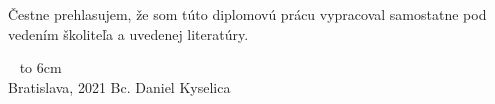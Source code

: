 {~}\vspace{12cm}

\thispagestyle{empty}
\noindent
\begin{minipage}{0.25\textwidth}~\end{minipage}
\begin{minipage}{0.75\textwidth}
Čestne prehlasujem, že som túto diplomovú prácu vypracoval samostatne pod vedením školiteľa a uvedenej literatúry. 
\end{minipage}
\vfill
~ \hfill {\hbox to 6cm{\dotfill}} \\
Bratislava, 2021 \hfill Bc. Daniel Kyselica
\vfill\eject 